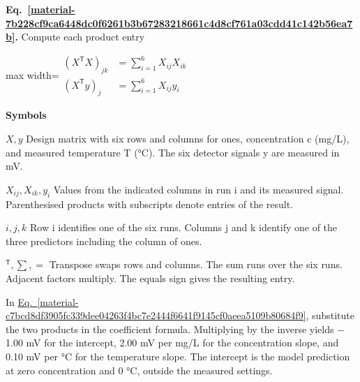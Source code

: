 \documentclass[11pt,a4paper]{article}
\begin{document}
\medskip

\par\medskip
\noindent\begin{minipage}{\linewidth}
\label{material-7b228cf9ca6448dc0f6261b3b67283218661c4d8cf761a03cdd41c142b56ea7b}
\noindent\textbf{Eq.~\ref*{material-7b228cf9ca6448dc0f6261b3b67283218661c4d8cf761a03cdd41c142b56ea7b}.} Compute each product entry\par\nopagebreak
\begin{center}\begin{adjustbox}{max width=\linewidth}$\displaystyle \begin{aligned}(X^{\mathsf T}X)_{jk}&=\sum_{i=1}^{6}X_{ij}X_{ik}\\[.45em](X^{\mathsf T}y)_j&=\sum_{i=1}^{6}X_{ij}y_i\end{aligned}$\end{adjustbox}\end{center}

\par\noindent\textbf{Symbols}

\par\noindent\textbf{\(X,y\)} Design matrix with six rows and columns for ones, concentration c (mg/L), and measured temperature T (°C). The six detector signals y are measured in mV.

\par\noindent\textbf{\(X_{ij},X_{ik},y_i\)} Values from the indicated columns in run i and its measured signal. Parenthesised products with subscripts denote entries of the result.

\par\noindent\textbf{\(i,j,k\)} Row i identifies one of the six runs. Columns j and k identify one of the three predictors including the column of ones.

\par\noindent\textbf{\({}^{\mathsf T},\sum,=\)} Transpose swaps rows and columns. The sum runs over the six runs. Adjacent factors multiply. The equals sign gives the resulting entry.

\end{minipage}\par
\medskip

In \hyperref[material-c7bcd8df3905fc339dee04263f4bc7e2444f6641f9145cf0aeea5109b80684f9]{Eq.~\ref*{material-c7bcd8df3905fc339dee04263f4bc7e2444f6641f9145cf0aeea5109b80684f9}}, substitute the two products in the coefficient formula. Multiplying by the inverse yields \ensuremath{-}1.00 mV for the intercept, 2.00 mV per mg/L for the concentration slope, and 0.10 mV per °C for the temperature slope. The intercept is the model prediction at zero concentration and 0 °C, outside the measured settings.
\end{document}
